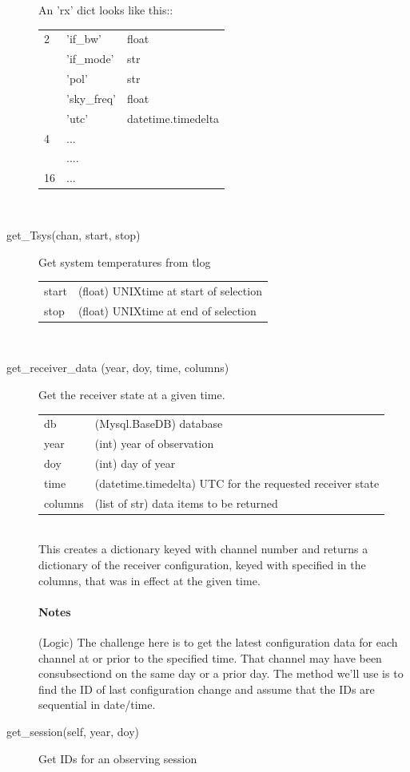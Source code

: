 \documentclass[letterpaper,11pt]{report}
\begin{document}
\begin{description}
    An 'rx' dict looks like this:: \\
    \begin{tabular}{lll}
        2& 'if\_bw' &    float \\
        & 'if\_mode' &  str \\
        & 'pol' &      str \\
        & 'sky\_freq' & float \\
        & 'utc' &      datetime.timedelta \\
        4 &  ...  & \\
        &  .... & \\
        16 & { ... } & \\
    \end{tabular} \\
    \item[get\_Tsys(chan, start, stop)] Get system temperatures from tlog\\
    \begin{tabular}{ll}
        start & (float) UNIXtime at start of selection \\
        stop & (float) UNIXtime at end of selection \\
    \end{tabular}\\
    \item[get\_receiver\_data (year, doy, time, columns)] Get the receiver 
    state at a given time.\\
    \begin{tabular}{ll}
        db & (Mysql.BaseDB) database \\
        year & (int) year of observation \\
        doy & (int) day of year \\
        time & (datetime.timedelta) UTC for the requested receiver state\\
        columns & (list of str) data items to be returned
    \end{tabular}\\
    This creates a dictionary keyed with channel number and returns a dictionary
    of the receiver configuration, keyed with specified in the columns, that was
    in effect at the given time.
    
    \paragraph{Notes} (Logic) The challenge here is to get the latest configuration 
    data for each channel at or prior to the specified time.  That channel may have 
    been consubsectiond on the same day or a prior day. The method we'll use is to find 
    the ID of last configuration change and assume that the IDs are sequential in 
    date/time.
    \item[get\_session(self, year, doy)] Get IDs for an observing session
\end{description}
\end{document}
